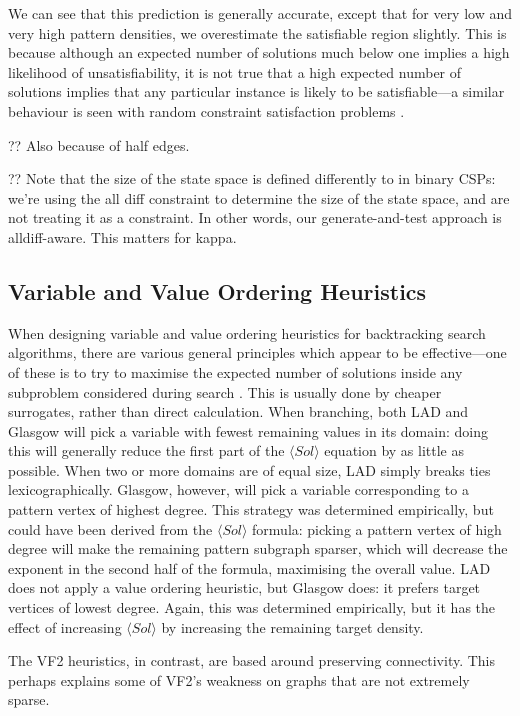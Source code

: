 \documentclass[letterpaper]{article}
\begin{document}
We can see that this prediction is generally accurate, except that for very low and very high
pattern densities, we overestimate the satisfiable region slightly. This is because although an
expected number of solutions much below one implies a high likelihood of unsatisfiability, it is not
true that a high expected number of solutions implies that any particular instance is likely to be
satisfiable---a similar behaviour is seen with random constraint satisfaction problems
\citep{Smith:1994,Smith:1996}.

?? Also because of half edges.

?? Note that the size of the state space is defined differently to in binary CSPs: we're using the
all diff constraint to determine the size of the state space, and are not treating it as a
constraint. In other words, our generate-and-test approach is alldiff-aware. This matters for kappa.

\subsection{Variable and Value Ordering Heuristics}

When designing variable and value ordering heuristics for backtracking search algorithms, there are
various general principles which appear to be effective---one of these is to try to maximise the
expected number of solutions inside any subproblem considered during search \citep{Gent:1996:EN}.
This is usually done by cheaper surrogates, rather than direct calculation. When branching, both LAD
and Glasgow will pick a variable with fewest remaining values in its domain: doing this will
generally reduce the first part of the $\langle Sol \rangle$ equation by as little as possible. When
two or more domains are of equal size, LAD simply breaks ties lexicographically. Glasgow, however, will
pick a variable corresponding to a pattern vertex of highest degree. This strategy was determined
empirically, but could have been derived from the $\langle Sol \rangle$ formula: picking a
pattern vertex of high degree will make the remaining pattern subgraph sparser, which will decrease
the exponent in the second half of the formula, maximising the overall value. LAD does not apply a
value ordering heuristic, but Glasgow does: it prefers target vertices of lowest degree. Again, this
was determined empirically, but it has the effect of increasing $\langle Sol \rangle$ by increasing
the remaining target density.

The VF2 heuristics, in contrast, are based around preserving connectivity. This perhaps explains
some of VF2's weakness on graphs that are not extremely sparse.
\end{document}
